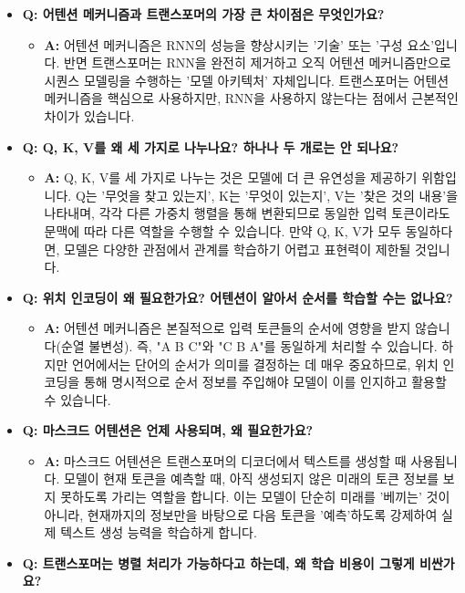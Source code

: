 \documentclass[11pt,a4paper]{article}
\theoremstyle{definition}
\begin{document}
\begin{itemize}
    \item \textbf{Q: 어텐션 메커니즘과 트랜스포머의 가장 큰 차이점은 무엇인가요?}
    \begin{itemize}
        \item \textbf{A:} 어텐션 메커니즘은 RNN의 성능을 향상시키는 '기술' 또는 '구성 요소'입니다. 반면 트랜스포머는 RNN을 완전히 제거하고 오직 어텐션 메커니즘만으로 시퀀스 모델링을 수행하는 '모델 아키텍처' 자체입니다. 트랜스포머는 어텐션 메커니즘을 핵심으로 사용하지만, RNN을 사용하지 않는다는 점에서 근본적인 차이가 있습니다.
    \end{itemize}
    \item \textbf{Q: Q, K, V를 왜 세 가지로 나누나요? 하나나 두 개로는 안 되나요?}
    \begin{itemize}
        \item \textbf{A:} Q, K, V를 세 가지로 나누는 것은 모델에 더 큰 유연성을 제공하기 위함입니다. Q는 '무엇을 찾고 있는지', K는 '무엇이 있는지', V는 '찾은 것의 내용'을 나타내며, 각각 다른 가중치 행렬을 통해 변환되므로 동일한 입력 토큰이라도 문맥에 따라 다른 역할을 수행할 수 있습니다. 만약 Q, K, V가 모두 동일하다면, 모델은 다양한 관점에서 관계를 학습하기 어렵고 표현력이 제한될 것입니다.
    \end{itemize}
    \item \textbf{Q: 위치 인코딩이 왜 필요한가요? 어텐션이 알아서 순서를 학습할 수는 없나요?}
    \begin{itemize}
        \item \textbf{A:} 어텐션 메커니즘은 본질적으로 입력 토큰들의 순서에 영향을 받지 않습니다(순열 불변성). 즉, "A B C"와 "C B A"를 동일하게 처리할 수 있습니다. 하지만 언어에서는 단어의 순서가 의미를 결정하는 데 매우 중요하므로, 위치 인코딩을 통해 명시적으로 순서 정보를 주입해야 모델이 이를 인지하고 활용할 수 있습니다.
    \end{itemize}
    \item \textbf{Q: 마스크드 어텐션은 언제 사용되며, 왜 필요한가요?}
    \begin{itemize}
        \item \textbf{A:} 마스크드 어텐션은 트랜스포머의 디코더에서 텍스트를 생성할 때 사용됩니다. 모델이 현재 토큰을 예측할 때, 아직 생성되지 않은 미래의 토큰 정보를 보지 못하도록 가리는 역할을 합니다. 이는 모델이 단순히 미래를 '베끼는' 것이 아니라, 현재까지의 정보만을 바탕으로 다음 토큰을 '예측'하도록 강제하여 실제 텍스트 생성 능력을 학습하게 합니다.
    \end{itemize}
    \item \textbf{Q: 트랜스포머는 병렬 처리가 가능하다고 하는데, 왜 학습 비용이 그렇게 비싼가요?}

\end{itemize}
\end{document}
